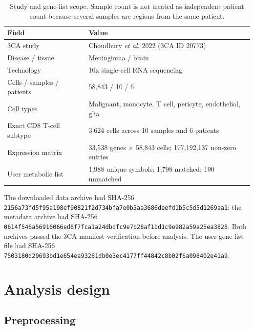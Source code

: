 \documentclass[11pt]{article}
\begin{document}
\begin{table}[H]
\centering
\small
\begin{tabular}{ll}
\toprule
Field & Value \\
\midrule
3CA study & Choudhury \emph{et al.} 2022 (3CA ID 20773) \\
Disease / tissue & Meningioma / brain \\
Technology & 10x single-cell RNA sequencing \\
Cells / samples / patients & 58,843 / 10 / 6 \\
Cell types & Malignant, monocyte, T cell, pericyte, endothelial, glia \\
Exact CD8 T-cell subtype & 3,624 cells across 10 samples and 6 patients \\
Expression matrix & 33,538 genes $\times$ 58,843 cells; 177,192,137 non-zero entries \\
User metabolic list & 1,988 unique symbols; 1,798 matched; 190 unmatched \\
\bottomrule
\end{tabular}
\caption{Study and gene-list scope. Sample count is not treated as independent patient count because several samples are regions from the same patient.}
\end{table}

\begin{minipage}{\textwidth}\small\raggedright
The downloaded data archive had SHA-256
\texttt{2156a73f\allowbreak d5f95a19\allowbreak 8ef90821\allowbreak f2d734bf\allowbreak a7e0b5aa\allowbreak 3686deef\allowbreak d1b5c5d5\allowbreak d1269aa1}; the metadata archive had SHA-256
\texttt{0614f546\allowbreak a5691606\allowbreak 6ed8f7fc\allowbreak a1a24dbd\allowbreak fc9e7b28\allowbreak af1bd1c9\allowbreak e982a59a\allowbreak 25ea3828}. Both archives passed the 3CA manifest verification before analysis. The user gene-list file had SHA-256
\texttt{7503180d\allowbreak 29693bd1\allowbreak e654ea93\allowbreak 281db0e3\allowbreak ec4177ff\allowbreak 44842c8b\allowbreak 02f6a098\allowbreak 402e41a9}.
\end{minipage}

\section{Analysis design}

\subsection{Preprocessing}
\end{document}
